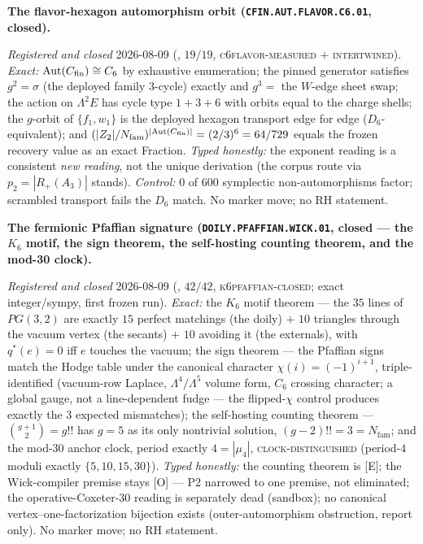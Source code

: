 \documentclass[11pt,a4paper]{article}
\newcommand{\Nfam}{N_{\mathrm{fam}}}
\begin{document}
\par\smallskip\noindent\textbf{The flavor-hexagon automorphism
orbit (\texttt{CFIN.AUT.\allowbreak FLAVOR.C6.01}, closed).}
{\sloppy
\emph{Registered and closed} 2026-08-09
(, $19/19$,
\textsc{c6flavor-measured} $+$ \textsc{intertwined}).
\emph{Exact:} $\mathrm{Aut}(C_{\rm fin}) \cong C_6$ by
exhaustive enumeration; the pinned generator satisfies $g^2 =
\sigma$ (the deployed family $3$-cycle) exactly and $g^3 =$ the
$W$-edge sheet swap; the action on $\Lambda^2 E$ has cycle type
$1 + 3 + 6$ with orbits equal to the charge shells; the
$g$-orbit of $\{f_1, w_1\}$ is the deployed hexagon transport
edge for edge ($D_6$-equivalent); and $(|Z_2|/\Nfam)^{|
\mathrm{Aut}(C_{\rm fin})|} = (2/3)^6 = 64/729$ equals the
frozen recovery value as an exact Fraction.  \emph{Typed
honestly:} the exponent reading is a consistent \emph{new
reading}, not the unique derivation (the corpus route via $p_2
= |R_+(A_3)|$ stands).  \emph{Control:} $0$ of $600$ symplectic
non-automorphisms factor; scrambled transport fails the $D_6$
match.  No marker move; no RH statement.\par}

\par\smallskip\noindent\textbf{The fermionic Pfaffian signature
(\texttt{DOILY.PFAFFIAN.\allowbreak WICK.01}, closed --- the
$K_6$ motif, the sign theorem, the self-hosting counting
theorem, and the mod-30 clock).}
{\sloppy
\emph{Registered and closed} 2026-08-09
(, $42/42$,
\textsc{k6pfaffian-closed}; exact integer/sympy, first frozen
run).  \emph{Exact:} the $K_6$ motif theorem --- the $35$ lines
of $PG(3,2)$ are exactly $15$ perfect matchings (the doily) $+$
$10$ triangles through the vacuum vertex (the secants) $+$ $10$
avoiding it (the externals), with $q^{*}(e) = 0$ iff $e$
touches the vacuum; the sign theorem --- the Pfaffian signs
match the Hodge table under the canonical character $\chi(i) =
(-1)^{i+1}$, triple-identified (vacuum-row Laplace,
$\Lambda^4/\Lambda^5$ volume form, $C_6$ crossing character; a
global gauge, not a line-dependent fudge --- the flipped-$\chi$
control produces exactly the $3$ expected mismatches); the
self-hosting counting theorem --- $\binom{g+1}{2} = g!!$ has $g
= 5$ as its only nontrivial solution, $(g-2)!! = 3 = \Nfam$;
and the mod-$30$ anchor clock, period exactly $4 = |\mu_4|$,
\textsc{clock-distinguished} (period-$4$ moduli exactly $\{5,
10, 15, 30\}$).  \emph{Typed honestly:} the counting theorem is
[E]; the Wick-compiler premise stays [O] --- P2 narrowed to one
premise, not eliminated; the operative-Coxeter-$30$ reading is
separately dead (sandbox); no canonical
vertex--one-factorization bijection exists (outer-automorphism
obstruction, report only).  No marker move; no RH
statement.\par}
\end{document}

